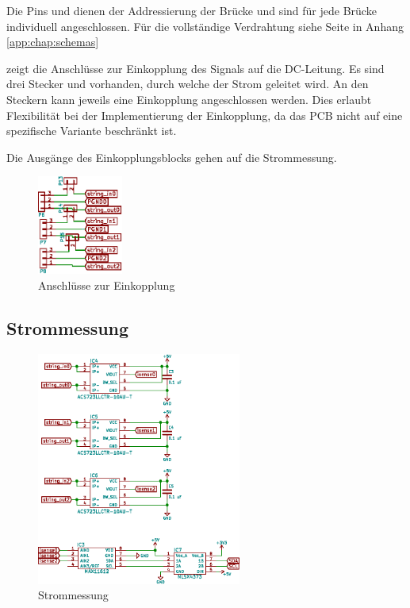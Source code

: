 Die Pins   und   dienen der  Addressierung der  Br\"ucke und
sind f\"ur  jede Br\"ucke individuell angeschlossen. F\"ur  die vollst\"andige
Verdrahtung  siehe Seite
\pageref{fig:schema:master:full}
in Anhang
\ref{app:chap:schemas}

 zeigt die  Anschl\"usse zur Einkopplung des
Signals auf die DC-Leitung. Es sind drei Stecker   und
  vorhanden,  durch  welche  der  Strom  geleitet  wird. An  den
Steckern kann jeweils eine  Einkopplung angeschlossen werden. Dies erlaubt
Flexibilit\"at bei der  Implementierung der Einkopplung, da  das PCB nicht
auf eine spezifische Variante beschr\"ankt ist.

Die Ausg\"ange des Einkopplungsblocks gehen auf die Strommessung.
\begin{figure}[h!tb]
    \centering
    \includegraphics[width=0.25\textwidth]{images/superv-sch/supervisor--sch--coupling.eps}
    \caption[\Master: Schema Einkopplung]{Anschl\"usse zur Einkopplung}
    \label{fig:sch:master:coupling}
\end{figure}


\subsection{Strommessung}
\label{subsec:hw:master:current}


\begin{figure}[h!t]
    \centering
    \includegraphics[angle=-90,width=0.60\textwidth]{images/superv-sch/supervisor--sch--current.eps}
    \caption[\Master: Schema Strommessung]{Strommessung}
    \label{fig:sch:master:current}
\end{figure}

